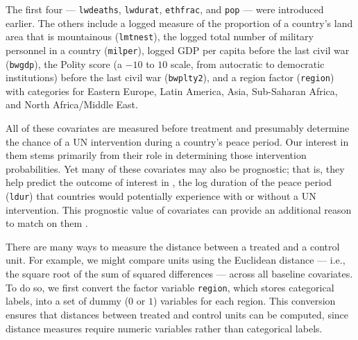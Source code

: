 \documentclass[
  12pt,
  leqno]{article}
\begin{document}
\doublespacing

The first four --- \texttt{lwdeaths}, \texttt{lwdurat},
\texttt{ethfrac}, and \texttt{pop} --- were introduced earlier. The
others include a logged measure of the proportion of a country's land
area that is mountainous (\texttt{lmtnest}), the logged total number of
military personnel in a country (\texttt{milper}), logged GDP per capita
before the last civil war (\texttt{bwgdp}), the Polity score (a \(-10\)
to \(10\) scale, from autocratic to democratic institutions) before the
last civil war (\texttt{bwplty2}), and a region factor (\texttt{region})
with categories for Eastern Europe, Latin America, Asia, Sub-Saharan
Africa, and North Africa/Middle East.

All of these covariates are measured before treatment and presumably
determine the chance of a UN intervention during a country's peace
period. Our interest in them stems primarily from their role in
determining those intervention probabilities. Yet many of these
covariates may also be prognostic; that is, they help predict the
outcome of interest in \citet{gilligansergenti2008}, the log duration of
the peace period (\texttt{ldur}) that countries would potentially
experience with or without a UN intervention. This prognostic value of
covariates can provide an additional reason to match on them
\citep{hansen2008a, salesetal2018}.

There are many ways to measure the distance between a treated and a
control unit. For example, we might compare units using the Euclidean
distance --- i.e., the square root of the sum of squared differences ---
across all baseline covariates. To do so, we first convert the factor
variable \texttt{region}, which stores categorical labels, into a set of
dummy (\(0\) or \(1\)) variables for each region. This conversion
ensures that distances between treated and control units can be
computed, since distance measures require numeric variables rather than
categorical labels.

\singlespacing
\end{document}

